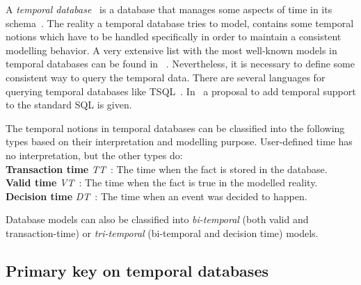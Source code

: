 %
%
A \emph{temporal database}~\cite{etzion1998} is a database that manages some aspects of time in its schema~\cite{Dyreson1994}. The reality a temporal database tries to model, contains some temporal notions which have to be handled specifically in order to maintain a consistent modelling behavior. A very extensive list with the most well-known models in temporal databases can be found in ~\cite{Yu1998}. Nevertheless, it is necessary to define some consistent way to query the temporal data. There are several languages for querying temporal databases like TSQL~\cite{TSQL}. In~\cite{Snodgrass98} a proposal to add temporal support to the standard SQL is given.


\begin{svgraybox}
The temporal notions in temporal databases can be classified into the following types based on their interpretation and modelling purpose. User-defined time has no interpretation, but the other types do:\\

	\textbf{Transaction time} \emph{TT}~\cite{Jensen:1991:IIM:627283.627484}: The time when the fact is stored in the database.\\
	
	\textbf{Valid time} \emph{VT}~\cite{Snodgrass:1984:TQL:588011.588041}: The time when the fact is true in the modelled reality.\\
	
	\textbf{Decision time} \emph{DT}~\cite{Nascimento95}: The time when an event was decided to happen. \\
\end{svgraybox}
	
Database models can also be classified into \emph{bi-temporal} (both valid and transaction-time) or \emph{tri-temporal}  (bi-temporal and decision time) models.



\subsection{\label{subsubsec:primary-key}Primary key on temporal databases}

